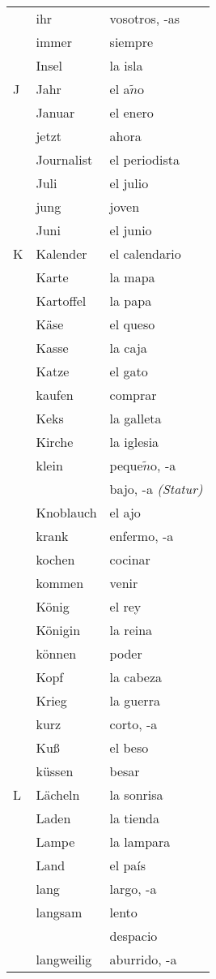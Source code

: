 \documentclass[10pt,spanish]{article}
\begin{document}
\begin{longtable}{p{} p{} | p{}}
& ihr & vosotros, -as\\
& immer & siempre  \\
& Insel & la isla  \\
J & Jahr & el a$\tilde{n}$o \\
& Januar & el enero  \\
& jetzt & ahora \\
& Journalist & el periodista  \\
& Juli & el julio  \\
& jung & joven \\
& Juni & el junio  \\
K & Kalender & el calendario  \\
& Karte & la mapa  \\
& Kartoffel & la papa  \\
& Käse & el queso  \\
& Kasse & la caja  \\
& Katze & el gato  \\
& kaufen & comprar  \\
& Keks & la galleta  \\
& Kirche & la iglesia  \\
& klein & peque$\tilde{n}$o, -a  \\
& & bajo, -a \textit{(Statur)}\\
& Knoblauch & el ajo  \\
& krank & enfermo, -a \\
& kochen & cocinar  \\
& kommen & venir  \\
& König & el rey  \\
& Königin & la reina  \\
& können & poder  \\
& Kopf & la cabeza \\
& Krieg & la guerra  \\
& kurz & corto, -a  \\
& Kuß & el beso  \\
& küssen & besar  \\
L & Lächeln & la sonrisa  \\
& Laden & la tienda  \\
& Lampe & la lampara  \\
& Land & el país  \\
& lang & largo, -a  \\
& langsam & lento\\
& & despacio\\
& langweilig & aburrido, -a\\

\end{longtable}
\end{document}

